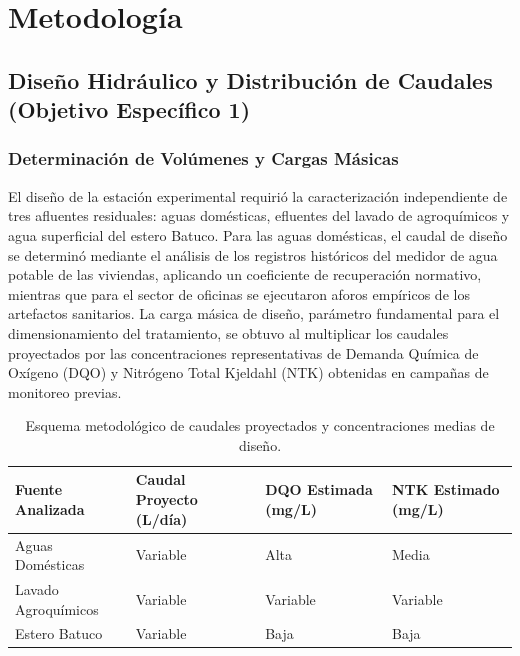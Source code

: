 \documentclass[12pt, letterpaper]{report}
\begin{document}
\chapter{Metodología}

\section{Diseño Hidráulico y Distribución de Caudales (Objetivo Específico 1)}

\subsection{Determinación de Volúmenes y Cargas Másicas}
El diseño de la estación experimental requirió la caracterización independiente de tres afluentes residuales: aguas domésticas, efluentes del lavado de agroquímicos y agua superficial del estero Batuco. Para las aguas domésticas, el caudal de diseño se determinó mediante el análisis de los registros históricos del medidor de agua potable de las viviendas, aplicando un coeficiente de recuperación normativo, mientras que para el sector de oficinas se ejecutaron aforos empíricos de los artefactos sanitarios. La carga másica de diseño, parámetro fundamental para el dimensionamiento del tratamiento, se obtuvo al multiplicar los caudales proyectados por las concentraciones representativas de Demanda Química de Oxígeno (DQO) y Nitrógeno Total Kjeldahl (NTK) obtenidas en campañas de monitoreo previas.

\begin{table}[H]
    \centering
    \caption{Esquema metodológico de caudales proyectados y concentraciones medias de diseño.}
    \vspace{0.5cm}
    \label{tab:caracterizacion_afluentes}
    \begin{tabular}{|>{\raggedright\arraybackslash}p{4cm}|>{\centering\arraybackslash}p{3.3cm}|>{\centering\arraybackslash}p{3.3cm}|>{\centering\arraybackslash}p{3.3cm}|}
        \hline
        \textbf{Fuente Analizada} & \textbf{Caudal Proyecto (L/día)} & \textbf{DQO Estimada (mg/L)} & \textbf{NTK Estimado (mg/L)} \\
        \hline
        Aguas Domésticas & Variable & Alta & Media \\
        Lavado Agroquímicos & Variable & Variable & Variable \\
        Estero Batuco & Variable & Baja & Baja \\
        \hline
    \end{tabular}
\end{table}
\end{document}
